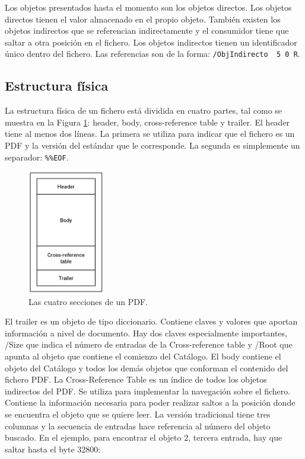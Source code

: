 Los objetos presentados hasta el momento son los objetos directos. Los objetos directos tienen el valor almacenado en el propio objeto. También existen los objetos indirectos que se referencian indirectamente y el consumidor tiene que saltar a otra posición en el fichero. Los objetos indirectos tienen un identificador único dentro del fichero. Las referencias son de la forma: \verb|/ObjIndirecto  5 0 R|.

\subsection{Estructura física}

La estructura física de un fichero está dividida en cuatro partes, tal como se muestra en la Figura \ref{fig:secciones-pdf}: header, body, cross-reference table y trailer. El header tiene al menos dos líneas. La primera se utiliza para indicar que el fichero es un PDF y la versión del estándar que le corresponde. La segunda es simplemente un separador: \verb|%%EOF|. 

\begin{figure}[hp!]
    \centering
    \includegraphics[width=0.3\textwidth]{imaxes/c-bases-teoricas/secciones-de-un-pdf.png}
    \caption{Las cuatro secciones de un PDF.}
    \label{fig:secciones-pdf}
\end{figure}

El trailer es un objeto de tipo diccionario. Contiene claves y valores que aportan información a nivel de documento. Hay dos claves especialmente importantes, /Size que indica el número de entradas de la Cross-reference table y /Root que apunta al objeto que contiene el comienzo del Catálogo. El body contiene el objeto del Catálogo y todos los demás objetos que conforman el contenido del fichero PDF. La Cross-Reference Table es un índice de todos los objetos indirectos del PDF. Se utiliza para implementar la navegación sobre el fichero. Contiene la información necesaria para poder realizar saltos a la posición donde se encuentra el objeto que se quiere leer. La versión tradicional tiene tres columnas y la secuencia de entradas hace referencia al número del objeto buscado. En el ejemplo, para encontrar el objeto 2, tercera entrada, hay que saltar hasta el byte 32800:

